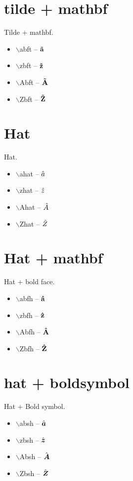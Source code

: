 \documentclass[twocolumn, a4paper]{article}
\begin{document}
	\section{tilde + mathbf}
	Tilde + mathbf.
	\begin{itemize} 
		\item $\backslash$abft -- $\mathbf{\tilde a}$
		\item $\backslash$zbft -- $\mathbf{\tilde z}$  
		\item $\backslash$Abft -- $\mathbf{\tilde A}$
		\item $\backslash$Zbft -- $\mathbf{\tilde Z}$  
	\end{itemize}

	\section{Hat}
	Hat.
	\begin{itemize} 
		\item $\backslash$ahat -- $\hat{a}$
		\item $\backslash$zhat -- $\hat{z}$  
		\item $\backslash$Ahat -- $\hat{A}$
		\item $\backslash$Zhat -- $\hat{Z}$  
	\end{itemize}
	
	\section{Hat + mathbf}
	Hat + bold face.
	\begin{itemize} 
		\item $\backslash$abfh -- $\mathbf{\hat a}$
		\item $\backslash$zbfh -- $\mathbf{\hat z}$  
		\item $\backslash$Abfh -- $\mathbf{\hat A}$
		\item $\backslash$Zbfh -- $\mathbf{\hat Z}$  
	\end{itemize}



	\section{hat + boldsymbol}
	Hat + Bold symbol.
	\begin{itemize} 
		\item $\backslash$absh -- $\hat{\boldsymbol{a}}$
		\item $\backslash$zbsh -- $\hat{\boldsymbol{z}}$  
		\item $\backslash$Absh -- $\hat{\boldsymbol{A}}$
		\item $\backslash$Zbsh -- $\hat{\boldsymbol{Z}}$  
	\end{itemize}
\end{document}
